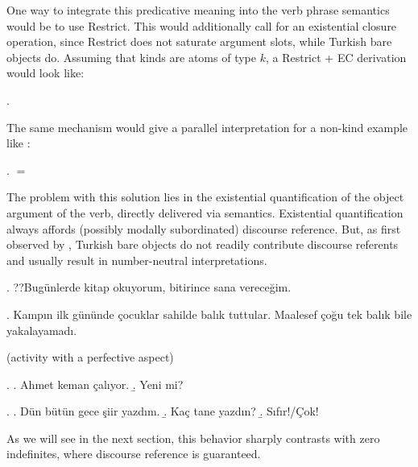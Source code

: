 \documentclass[11pt,a4paper]{article}
\begin{document}
One way to integrate this predicative meaning into the verb phrase semantics
would be to use  Restrict. This would additionally call
for an existential closure operation, since Restrict does not saturate argument
slots, while Turkish bare objects do. Assuming that kinds are atoms of type
$k$, a Restrict + EC derivation would look like:

\ex.


The same mechanism would give a parallel interpretation for a non-kind example like :

\ex.
 $=$ 


The problem with this solution lies in the existential quantification of the
object argument of the verb, directly delivered via semantics. Existential
quantification always affords (possibly modally subordinated) discourse
reference. But, as first observed by , Turkish bare objects
do not readily contribute discourse referents and usually result in
number-neutral interpretations.

\ex. ??Bugünlerde kitap okuyorum, bitirince sana vereceğim.

\ex. Kampın ilk gününde çocuklar sahilde balık tuttular. Maalesef çoğu tek balık bile yakalayamadı.

(activity with a perfective aspect)


\ex.
\a. Ahmet keman çalıyor.
\b.  Yeni mi?


\ex.
\a. Dün bütün gece şiir yazdım.
\b. Kaç tane yazdın?
\b. Sıfır!/Çok!

As we will see in the next section, this behavior sharply contrasts with zero
indefinites, where discourse reference is guaranteed.
\end{document}
